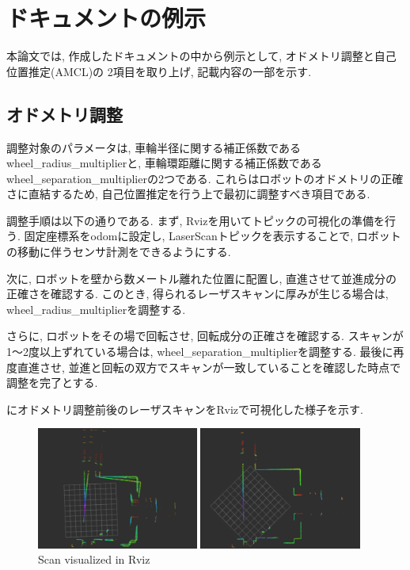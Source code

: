 \section{ドキュメントの例示}
本論文では, 作成したドキュメントの中から例示として, オドメトリ調整と自己位置推定(AMCL)の
2項目を取り上げ, 記載内容の一部を示す. 

\subsection{オドメトリ調整}
調整対象のパラメータは, 車輪半径に関する補正係数であるwheel\_radius\_multiplierと, 車輪環距離に関する補正係数であるwheel\_separation\_multiplierの2つである. 
これらはロボットのオドメトリの正確さに直結するため, 自己位置推定を行う上で最初に調整すべき項目である. 

調整手順は以下の通りである. まず, Rvizを用いてトピックの可視化の準備を行う. 固定座標系をodomに設定し, LaserScanトピックを表示することで, ロボットの移動に伴うセンサ計測をできるようにする. 

次に, ロボットを壁から数メートル離れた位置に配置し, 直進させて並進成分の正確さを確認する. 
このとき, 得られるレーザスキャンに厚みが生じる場合は, wheel\_radius\_multiplierを調整する. 

さらに, ロボットをその場で回転させ, 回転成分の正確さを確認する. 
スキャンが1〜2度以上ずれている場合は, wheel\_separation\_multiplierを調整する. 
最後に再度直進させ, 並進と回転の双方でスキャンが一致していることを確認した時点で調整を完了とする. 

にオドメトリ調整前後のレーザスキャンをRvizで可視化した様子を示す. 
\begin{figure}[h]
     \centering
     \begin{minipage}[c]{65mm}
         \centering
         \includegraphics[height=40mm]{images/before_odom.png}
     \end{minipage}
     \begin{minipage}[c]{65mm}
         \centering
         \includegraphics[height=40mm]{images/after_odom.png}
     \end{minipage}
     \caption{Scan visualized in Rviz}
     \label{fig:Scanvisualizedinrviz}
\end{figure}

